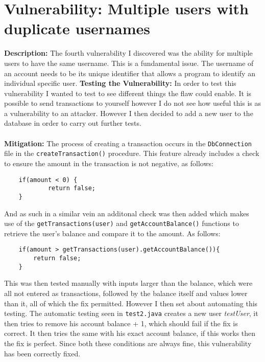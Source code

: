 \section{Vulnerability: Multiple users with duplicate usernames}
\label{sec:background}
\textbf{Description:} The fourth vulnerability I discovered was the ability for multiple users to have the same username. This is a fundamental issue. The username of an account
needs to be its unique identifier that allows a program to identify an individual specific user. 
\textbf{Testing the Vulnerability:} In order to test this vulnerability I wanted to test to see different things the flaw could enable. It is possible to send
transactions to yourself however I do not see how useful this is as a vulnerability to an attacker. However I then decided to add a new user to the database in order
to carry out further tests. \\ \\
\textbf{Mitigation:} The process of creating a transaction occurs in the \verb|DbConnection| file in the \verb|createTransaction()| procedure. This feature already
includes a check to ensure the amount in the transaction is not negative, as follows:
\begin{verbatim}
    if(amount < 0) {
            return false;
    }
\end{verbatim}
And as such in a similar vein an additonal check was then added which makes use of the \verb|getTransactions(user)| and \verb|getAccountBalance()| functions to retrieve
the user's balance and compare it to the amount. As follows:
\begin{verbatim}
    if(amount > getTransactions(user).getAccountBalance()){
        return false;
    }
\end{verbatim}
This was then tested manually with inputs larger than the balance, which were all not entered as transactions, followed by the balance itself and values lower than it, all of
which the fix permitted. However I then set about automating this testing. The automatic testing seen in \verb|test2.java| creates a new user \textit{testUser}, it then tries
to remove his account balance + 1, which should fail if the fix is correct. It then tries the same with his exact account balance, if this works then the fix is perfect. Since
both these conditions are always fine, this vulnerability has been correctly fixed.
